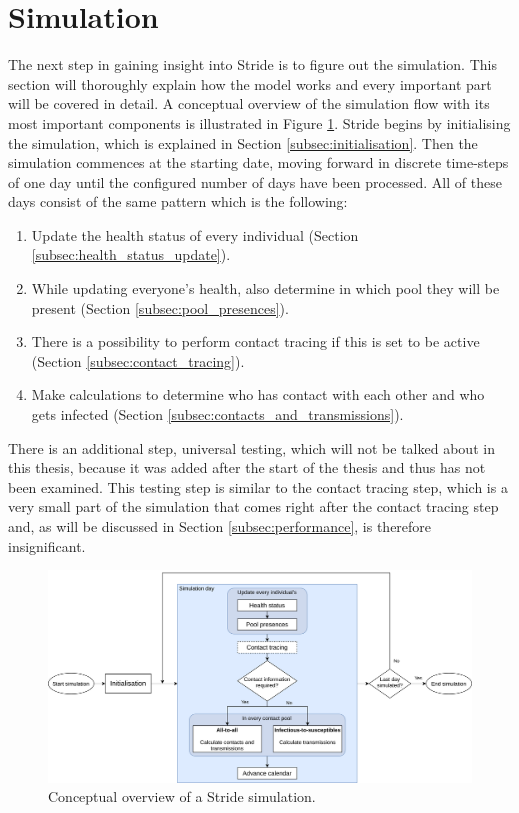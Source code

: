 \section{Simulation}
\label{sec:simulation}
The next step in gaining insight into Stride is to figure out the simulation. This section will thoroughly explain how the model works and every important part will be covered in detail. A conceptual overview of the simulation flow with its most important components is illustrated in Figure \ref{fig:simulation_flow}. Stride begins by initialising the simulation, which is explained in Section \ref{subsec:initialisation}. Then the simulation commences at the starting date, moving forward in discrete time-steps of one day until the configured number of days have been processed. All of these days consist of the same pattern which is the following:
\begin{enumerate}
    \item Update the health status of every individual (Section \ref{subsec:health_status_update}).
    \item While updating everyone's health, also determine in which pool they will be present (Section \ref{subsec:pool_presences}).
    \item There is a possibility to perform contact tracing if this is set to be active (Section \ref{subsec:contact_tracing}).
    \item Make calculations to determine who has contact with each other and who gets infected (Section \ref{subsec:contacts_and_transmissions}).
\end{enumerate}
There is an additional step, universal testing, which will not be talked about in this thesis, because it was added after the start of the thesis and thus has not been examined. This testing step is similar to the contact tracing step, which is a very small part of the simulation that comes right after the contact tracing step and, as will be discussed in Section \ref{subsec:performance}, is therefore insignificant.

\begin{figure}
    \centering
    \includegraphics[width=\textwidth]{3 - Stride/fig/high-level_flow.png}
    \caption{Conceptual overview of a Stride simulation.}
    \label{fig:simulation_flow}
\end{figure}

